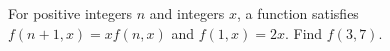 For positive integers $ n $ and integers $ x $, a function satisfies $ f(n+1,x)=xf(n,x)$ and $ f(1,x)=2x $. Find $ f(3,7)$.
